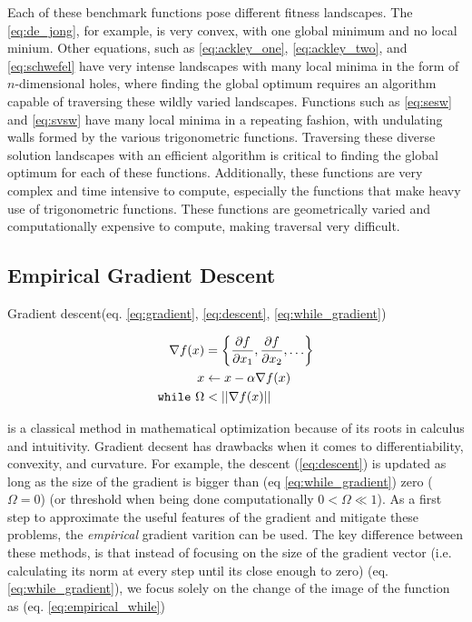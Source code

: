 \documentclass{article}
\begin{document}
Each of these benchmark functions pose different fitness landscapes. The \ref{eq:de_jong}, for example, is very convex, with one global minimum and no local minium. Other equations, such as \ref{eq:ackley_one}, \ref{eq:ackley_two}, and \ref{eq:schwefel} have very intense landscapes with many local minima in the form of $n$-dimensional holes, where finding the global optimum requires an algorithm capable of traversing these wildly varied landscapes. Functions such as \ref{eq:sesw} and \ref{eq:svsw} have many local minima in a repeating fashion, with undulating walls formed by the various trigonometric functions. Traversing these diverse solution landscapes with an efficient algorithm is critical to finding the global optimum for each of these functions. Additionally, these functions are very complex and time intensive to compute, especially the functions that make heavy use of trigonometric functions. These functions are geometrically varied and computationally expensive to compute, making traversal very difficult.
        \subsection{Empirical Gradient Descent}

            Gradient descent(eq. \ref{eq:gradient}, \ref{eq:descent}, \ref{eq:while_gradient})
            
            \begin{align}
                \label{eq:gradient} \nabla f(x) &= \left\{ \frac{\partial f}{\partial x_1}, \frac{\partial f}{\partial x_2}, \ldots\right\} \\
                \label{eq:descent} x &\leftarrow x - \alpha \nabla f(x) \\
                \label{eq:while_gradient} \text{\texttt{while} } \Omega &< ||\nabla f(x)||
            \end{align}
            
            is a classical method in mathematical optimization because of its roots in calculus and intuitivity.  Gradient decsent has drawbacks when it comes to differentiability,  convexity, and curvature.  For example, the descent (\ref{eq:descent}) is updated as long as the size of the gradient is bigger than (eq \ref{eq:while_gradient}) zero ($\Omega = 0$) (or threshold when being done computationally $0 < \Omega \ll 1$).  As a first step to approximate the useful features of the gradient and mitigate these problems, the \emph{empirical} gradient varition can be used.  The key difference between these methods, is that instead of focusing on the size of the gradient vector (i.e. calculating its norm at every step until its close enough to zero) (eq. \ref{eq:while_gradient}), we focus solely on the change of the image of the function as (eq. \ref{eq:empirical_while})
\end{document}
